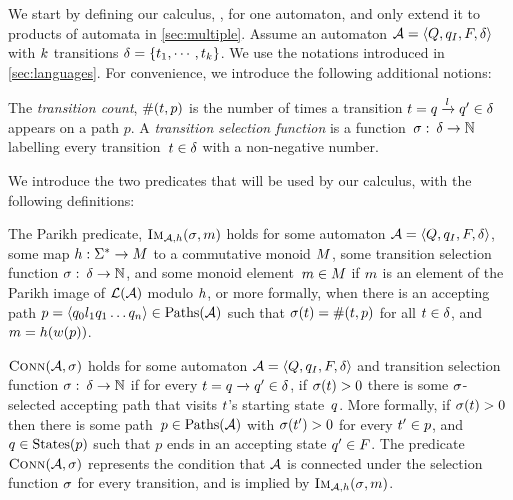 We start by defining our calculus, \Calculus{}, for one automaton, and only
extend it to products of automata in \cref{sec:multiple}.
%
Assume an automaton $\mathcal{A} = \left\langle Q, q_I, F, \delta\right\rangle$ with $k$
transitions $\delta =
\left\{t_{1} , \cdots , t_{k}\right\}$. We use
the notations introduced in \cref{sec:languages}. For convenience, we
introduce the following additional notions:

\begin{definition}
  The \textit{transition count},
  $\operatorname{\#}(t, p)$ is the number of times a
  transition
  $t = q \xrightarrow{l} q' \in
  \delta$ appears on a path $p$. A \emph{transition selection
    function} is a function~$\operatorname{\sigma}:\: \delta \to \mathbb{N}$
  labelling every transition~$t \in \delta$ with a
  non-negative number.
\end{definition}

We introduce the two predicates that will be used by our calculus,
with the following definitions:
%
\begin{definition}\label{def:single-image}
  The Parikh predicate, $\operatorname{\textsc{Im}}_{\mathcal{A}, h}(\operatorname{\sigma}, m)$ holds for some
  automaton $\mathcal{A} = \left\langle Q, q_I, F, \delta\right\rangle$, some map
  $h : \Sigma^* \to M$ to a commutative monoid $M$,
  some transition selection function
  $\operatorname{\sigma}:\: \delta \to \mathbb{N}$, and some monoid
  element~$m \in M$ if $m$ is an
  element of the Parikh image of $\operatorname{\mathcal{L}}(\mathcal{A})$ modulo
  $h$, or more formally, when there is an accepting path
  $p = \left\langle q_0 l_1 q_1 \ldots q_n\right\rangle \in \operatorname{Paths}(\mathcal{A})$ such
  that $\operatorname{\sigma}(t) = \operatorname{\#}(t, p)$
  for all $t \in \delta$, and
  $m = h(w(p))$.
\end{definition}

\begin{definition}\label{def:connected} $\operatorname{\textsc{Conn}}(\mathcal{A}, \operatorname{\sigma})$
  holds for some automaton $\mathcal{A} = \left\langle Q, q_I, F, \delta\right\rangle$ and
  transition selection function
  $\operatorname{\sigma}:\: \delta \to \mathbb{N}$
  if for every
  $t = q \xrightarrow{} q' \in \delta$,
  if $\operatorname{\sigma}(t) > 0$ there is some $\operatorname{\sigma}$-selected
  accepting path that visits $t$'s starting state~$q$. More formally,
  if $\operatorname{\sigma}(t) > 0$ then there is some
  path~$p \in \operatorname{Paths}(\mathcal{A})$ with
  $\operatorname{\sigma}(t') > 0$ for every $t' \in p$, and $q \in
  \operatorname{States}(p)$ such that $p$ ends in an accepting state $q' \in F$. The predicate~$\operatorname{\textsc{Conn}}(\mathcal{A}, \operatorname{\sigma})$ represents the
  condition that $\mathcal{A}$ is connected under the selection
  function $\operatorname{\sigma}$ for every transition, and is implied by
  $\operatorname{\textsc{Im}}_{\mathcal{A}, h}(\operatorname{\sigma}, m)$.
\end{definition}


